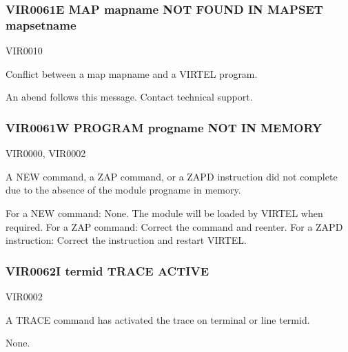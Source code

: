\documentclass[letterpaper,10pt,english]{sphinxmanual}
\begin{document}
\subsubsection{VIR0061E MAP mapname NOT FOUND IN MAPSET mapsetname}
\label{\detokenize{messages:vir0061e-map-mapname-not-found-in-mapset-mapsetname}}\begin{description}
\sphinxAtStartPar
VIR0010

\sphinxAtStartPar
Conflict between a map mapname and a VIRTEL program.

\sphinxAtStartPar
An abend follows this message. Contact technical support.

\end{description}


\subsubsection{VIR0061W PROGRAM progname NOT IN MEMORY}
\label{\detokenize{messages:vir0061w-program-progname-not-in-memory}}\begin{description}
\sphinxAtStartPar
VIR0000, VIR0002

\sphinxAtStartPar
A NEW command, a ZAP command, or a ZAPD instruction did not complete due to the absence of the module progname in memory.

\sphinxAtStartPar
For a NEW command: None. The module will be loaded by VIRTEL when required. For a ZAP command: Correct the command and reenter. For a ZAPD instruction: Correct the instruction and restart VIRTEL.

\end{description}


\subsubsection{VIR0062I termid TRACE ACTIVE}
\label{\detokenize{messages:vir0062i-termid-trace-active}}\begin{description}
\sphinxAtStartPar
VIR0002

\sphinxAtStartPar
A TRACE command has activated the trace on terminal or line termid.

\sphinxAtStartPar
None.

\end{description}
\end{document}
